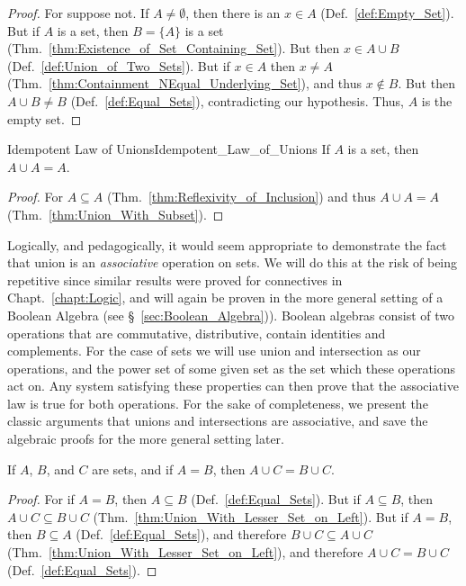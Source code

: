         \begin{proof}
            For suppose not. If $A\ne\emptyset$, then there is an $x\in{A}$
            (Def.~\ref{def:Empty_Set}). But if $A$ is a set, then $B=\{A\}$ is a
            set (Thm.~\ref{thm:Existence_of_Set_Containing_Set}). But then
            $x\in{A}\cup{B}$ (Def.~\ref{def:Union_of_Two_Sets}). But if
            $x\in{A}$ then $x\ne{A}$
            (Thm.~\ref{thm:Containment_NEqual_Underlying_Set}), and thus
            $x\notin{B}$. But then $A\cup{B}\ne{B}$ (Def.~\ref{def:Equal_Sets}),
            contradicting our hypothesis. Thus, $A$ is the empty set.
        \end{proof}
        \begin{ltheorem}{Idempotent Law of Unions}{Idempotent_Law_of_Unions}
            If $A$ is a set, then $A\cup{A}=A$.
        \end{ltheorem}
        \begin{proof}
            For $A\subseteq{A}$ (Thm.~\ref{thm:Reflexivity_of_Inclusion}) and
            thus $A\cup{A}=A$ (Thm.~\ref{thm:Union_With_Subset}).
        \end{proof}
        Logically, and pedagogically, it would seem appropriate to demonstrate
        the fact that union is an \textit{associative} operation on sets. We
        will do this at the risk of being repetitive since similar results were
        proved for connectives in Chapt.~\ref{chapt:Logic}, and will again be
        proven in the more general setting of a Boolean Algebra
        (see \S~\ref{sec:Boolean_Algebra})). Boolean algebras consist of two
        operations that are commutative, distributive, contain identities and
        complements. For the case of sets we will use union and intersection as
        our operations, and the power set of some given set as the set which
        these operations act on. Any system satisfying these properties can then
        prove that the associative law is true for both operations. For the sake
        of completeness, we present the classic arguments that unions and
        intersections are associative, and save the algebraic proofs for the
        more general setting later.
        \begin{theorem}
            \label{thm:Union_with_Equal_Sets}%
            If $A$, $B$, and $C$ are sets, and if $A=B$, then
            $A\cup{C}=B\cup{C}$.
        \end{theorem}
        \begin{proof}
            For if $A=B$, then $A\subseteq{B}$ (Def.~\ref{def:Equal_Sets}). But
            if $A\subseteq{B}$, then $A\cup{C}\subseteq{B}\cup{C}$
            (Thm.~\ref{thm:Union_With_Lesser_Set_on_Left}). But if $A=B$, then
            $B\subseteq{A}$ (Def.~\ref{def:Equal_Sets}), and therefore
            $B\cup{C}\subseteq{A}\cup{C}$
            (Thm.~\ref{thm:Union_With_Lesser_Set_on_Left}), and therefore
            $A\cup{C}=B\cup{C}$ (Def.~\ref{def:Equal_Sets}).
        \end{proof}
